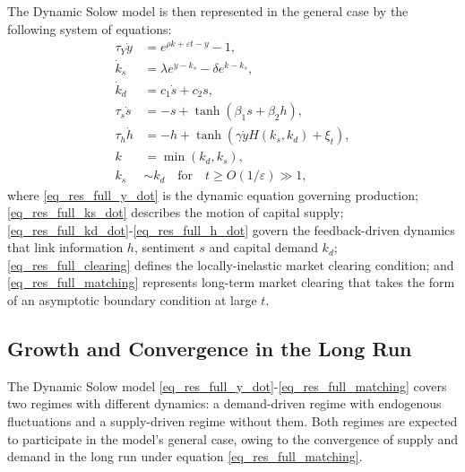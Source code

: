 \documentclass[authoryear, review]{elsarticle}
\begin{document}
The Dynamic Solow model is then represented in the general case by the following system of equations:
\begin{align}
	\tau_Y \dot{y} &= e^{\rho k + \varepsilon t - y} - 1 \label{eq_res_full_y_dot},\\
	\dot{k}_s &= \lambda e^{y-k_s} - \delta e^{k-k_s}\label{eq_res_full_ks_dot},\\
	\dot{k}_d &= c_1 \dot{s} + c_2 s \label{eq_res_full_kd_dot},\\
	\tau_s \dot{s} &= -s + \tanh\left(\beta_1 s + \beta_2 h \right)\label{eq_res_full_s_dot},\\
	\tau_h \dot{h} &= -h + \tanh\left(\gamma\dot{y}H(k_s,k_d) +\xi_t\right)\label{eq_res_full_h_dot}, \\
	k &= \min(k_d, k_s) \label{eq_res_full_clearing}, \\
	k_s &\sim k_d \quad \text{for} \quad t\geq O(1/\varepsilon)\gg1,\label{eq_res_full_matching}
\end{align}
where \eqref{eq_res_full_y_dot} is the dynamic equation governing production; \eqref{eq_res_full_ks_dot} describes the motion of capital supply; \eqref{eq_res_full_kd_dot}-\eqref{eq_res_full_h_dot} govern the feedback-driven dynamics that link information $h$, sentiment $s$ and capital demand $k_d$; \eqref{eq_res_full_clearing} defines the locally-inelastic market clearing condition; and \eqref{eq_res_full_matching} represents long-term market clearing that takes the form of an asymptotic boundary condition at large $t$. 

\subsection{Growth and Convergence in the Long Run}\label{sec_results_asymp}



The Dynamic Solow model \eqref{eq_res_full_y_dot}-\eqref{eq_res_full_matching} covers two regimes with different dynamics: a demand-driven regime with endogenous fluctuations and a supply-driven regime without them. Both regimes are expected to participate in the model's general case, owing to the convergence of supply and demand in the long run under equation \eqref{eq_res_full_matching}. 
\end{document}
